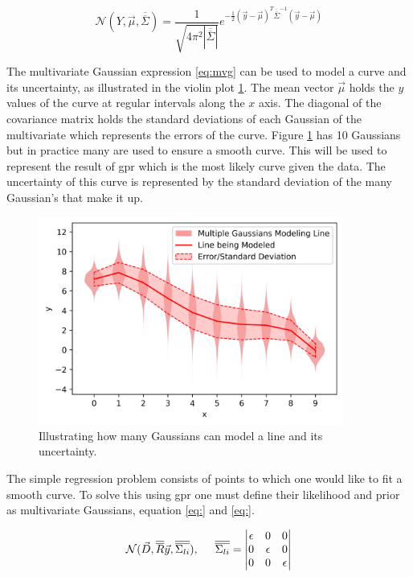 \begin{equation}
\mathcal{N}(Y, \Vec{\mu}, \overline{\overline{\Sigma}}) = \frac{1}{\sqrt{4\pi^2|\overline{\overline{\Sigma}}|}} e^{{-\frac{1}{2}(\Vec{y}-\Vec{\mu})^T\overline{\overline{\Sigma}}^{-1}(\Vec{y}-\Vec{\mu})}}
\label{eq:mvg}
\end{equation}

The multivariate Gaussian expression \ref{eq:mvg} can be used to model a curve and its uncertainty, as illustrated in the violin plot \ref{fig:mvg}. The mean vector $\Vec{\mu}$ holds the $y$ values of the curve at regular intervals along the $x$ axis. The diagonal of the covariance matrix holds the standard deviations of each Gaussian of the multivariate which represents the errors of the curve. Figure \ref{fig:mvg} has 10 Gaussians but in practice many are used to ensure a smooth curve. This will be used to represent the result of \gls{gpr} which is the most likely curve given the data. The uncertainty of this curve is represented by the standard deviation of the many Gaussian's that make it up.  

\begin{figure}
  \centering
  \includegraphics[width=10cm]{images/mvg.png}
  \caption{Illustrating how many Gaussians can model a line and its uncertainty.}
  \label{fig:mvg}
\end{figure}

The simple regression problem consists of points to which one would like to fit a smooth curve. To solve this using \gls{gpr} one must define their likelihood and prior as multivariate Gaussians, equation \ref{eq:} and \ref{eq:}.

\begin{equation}
    \mathcal{N}(\Vec{D}, \overline{\overline{R}}\Vec{y}, \overline{\overline{\Sigma_{li}}}),\hspace{0.5cm} \overline{\overline{\Sigma_{li}}} = \begin{vmatrix}
        \epsilon & 0 & 0\\
        0 & \epsilon & 0\\
        0 & 0 & \epsilon
    \end{vmatrix}
\end{equation}

